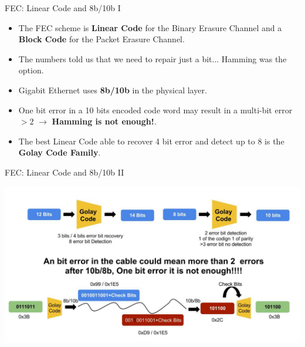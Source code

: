 \documentclass[compress,red]{beamer}
\begin{document}
\begin{frame}{FEC: Linear Code and 8b/10b I}

  \begin{itemize}
    \item The FEC scheme is \textbf{Linear Code} for the Binary Erasure
    Channel and a \textbf{Block Code} for the Packet Erasure Channel. 
    \item The numbers told us that we need to repair just a bit... Hamming was the option.
    \item Gigabit Ethernet uses \textbf{8b/10b} in the physical layer. 
    \item One bit error in a 10 bits encoded code word may result in a multi-bit
    error $>2$ $\rightarrow$
    \textbf{Hamming is not enough!}.
    \item The best Linear Code able to recover 4 bit error and detect up to 8 is
    the \textbf{Golay Code Family}.
  \end{itemize}
\end{frame}

\begin{frame}{FEC: Linear Code and 8b/10b II}
 
 \begin{center}
 \includegraphics[scale=0.25]{robustness/8b_10b_Golay.pdf}
 \end{center}

\end{frame}
\end{document}
